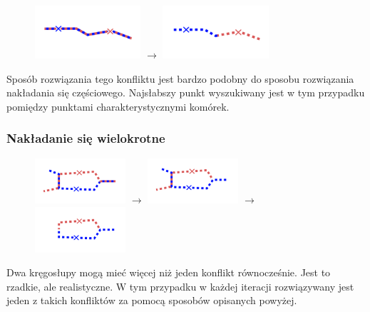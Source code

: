 \documentclass[declaration,shortabstract,mgr]{iithesis}
\begin{document}
\begin{figure}[h]
  \centering
  \includegraphics[valign=m,width=0.35\textwidth]{images/overlap-f.png}
  $\rightarrow$
  \includegraphics[valign=m,width=0.35\textwidth]{images/overlap-f-solved.png}
\end{figure}

Sposób rozwiązania tego konfliktu jest bardzo podobny do sposobu rozwiązania nakładania się częściowego. Najsłabszy punkt wyszukiwany jest w tym przypadku pomiędzy punktami charakterystycznymi komórek.


\subsubsection{Nakładanie się wielokrotne}

\begin{figure}[h]
  \centering
  \includegraphics[valign=m,width=0.3\textwidth]{images/overlap-m.png}
  $\rightarrow$
  \includegraphics[valign=m,width=0.3\textwidth]{images/overlap-m-solved1.png}
  $\rightarrow$
  \includegraphics[valign=m,width=0.3\textwidth]{images/overlap-m-solved2.png}
\end{figure}

Dwa kręgosłupy mogą mieć więcej niż jeden konflikt równocześnie. Jest to rzadkie, ale realistyczne.
W tym przypadku w każdej iteracji rozwiązywany jest jeden z takich konfliktów za pomocą sposobów opisanych powyżej.
\end{document}
